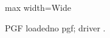 \documentclass{article}
\begin{document}
\begin{adjustbox}{max width=\textwidth}Wide\end{adjustbox}
\makeatletter\ifdefined\pgfversion PGF loaded\else no pgf\fi; driver \Gin@driver.\makeatother
\end{document}
